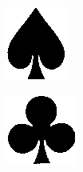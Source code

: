 \documentclass[a4paper,12pt,notitlepage]{article}
\begin{document}
\begin{figure}[H]
\begin{subfigure}[b]{0.15\textwidth}
				\includegraphics[width=\textwidth]{chris/image29}
				\caption{}
			\end{subfigure}
			\begin{subfigure}[b]{0.15\textwidth}
				\centering
				\includegraphics[width=\textwidth]{chris/image30}

\end{subfigure}
\end{figure}
\end{document}
